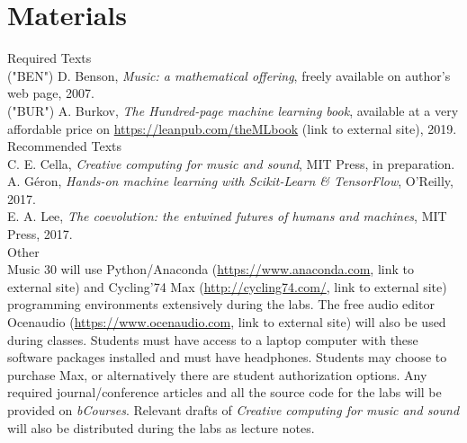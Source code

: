 \documentclass[letterpaper]{inzane_syllabus} %
\begin{document}
\vspace{0.5cm} %
\section{Materials}

{\color{myCOLOR} Required Texts}\\
("BEN") D. Benson, \textit{Music: a mathematical offering}, freely available on author's web page, 2007.\\
("BUR") A. Burkov, \textit{The Hundred-page machine learning book}, available at a very affordable price on \url{https://leanpub.com/theMLbook} (link to external site), 2019.\\

{\color{myCOLOR} Recommended Texts}\\
C. E. Cella, \textit{Creative computing for music and sound}, MIT Press, in preparation. \\
A. G\'eron, \textit{Hands-on machine learning with Scikit-Learn \& TensorFlow}, O'Reilly, 2017.\\
E. A. Lee, \textit{The coevolution: the entwined futures of humans and machines}, MIT Press, 2017.\\

{\color{myCOLOR} Other}\\
Music 30 will use Python/Anaconda (\url{https://www.anaconda.com}, link to external site) and Cycling’74 Max (\url{http://cycling74.com/}, link to external site) programming environments extensively during the labs. The free audio editor Ocenaudio (\url{https://www.ocenaudio.com}, link to external site) will also be used during classes. Students must have access to a laptop computer with these software packages installed and must have headphones. Students may choose to purchase Max, or alternatively there are student authorization options. Any required journal/conference articles and all the source code for the labs will be provided on \emph{bCourses}. Relevant drafts of \emph{Creative computing for music and sound} will also be distributed during the labs as lecture notes.
\end{document}
